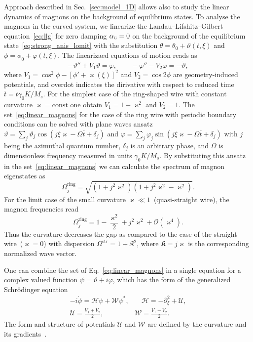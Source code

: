Approach described in Sec.~\ref{sec:model_1D} allows also to study the linear dynamics of magnons on the background of equilibrium states. To analyse the magnons in the curved system, we linearize the Landau--Lifshitz--Gilbert equation~\eqref{eq:llg} for zero damping $\alpha_\textsc{g}=0$ on the background of the equilibrium state~\eqref{eq:strong_anis_lomit} with the substitution $\theta=\theta_0+\vartheta(t,\xi)$ and $\phi=\phi_0+\varphi(t,\xi)$. The linearizaed equations of motion reads as~\cite{Sheka15,Gaididei18a,Korniienko19b}
\begin{equation}\label{eq:linear_magnons}
    -\vartheta''+V_1\vartheta = \dot{\varphi},\quad \quad -\varphi''-V_2\varphi = -\dot{\vartheta},
\end{equation}
where $V_1 = \cos^2\phi - \left[\phi'+\varkappa(\xi)\right]^2$ and $V_2 = \cos2\phi$ are geometry-induced potentials, and overdot indicates the dirivative with respect to reduced time $\overline{t}=t\gamma_0K/M_s$. For the simplest case of the ring-shaped wire with constant curvature $\varkappa=\text{const}$ one obtain $V_1=1-\varkappa^2$ and $V_2=1$. The set~\eqref{eq:linear_magnons} for the case of the ring wire with periodic boundary conditions can be solved with plane waves ansatz $\vartheta=\sum_j \vartheta_j \cos(j\xi\varkappa-\Omega\overline{t}+\delta_j)$ and $\varphi=\sum_j \varphi_j \sin(j\xi\varkappa-\Omega\overline{t}+\delta_j)$ with $j$ being the azimuthal quantum number, $\delta_j$ is an arbitrary phase, and $\Omega$ is dimensionless frequency measured in units $\gamma_0K/M_s$. By substituting this ansatz in the set~\eqref{eq:linear_magnons} we can calculate the spectrum of magnon eigenstates as
\begin{equation}\label{eq:spec_rings}
    \Omega^\text{ring}_j = \sqrt{\left(1+j^2\varkappa^2\right)\left(1+j^2\varkappa^2 - \varkappa^2\right)}.
\end{equation}
For the limit case of the small curvature $\varkappa\ll1$~(quasi-straight wire), the magnon frequencies read
\begin{equation}\label{eq:spec_rings_small}
    \Omega^\text{ring}_j = 1- \frac{\varkappa^2}{2}+j^2\varkappa^2+\mathcal{O}(\varkappa^4).
\end{equation}
Thus the curvature decreases the gap as compared to the case of the straight wire~($\varkappa=0$) with dispersion $\Omega^\text{str} = 1 + \mathfrak{K}^2$, where $\mathfrak{K}=j\varkappa$ is the corresponding normalized wave vector.

One can combine the set of Eq.~\eqref{eq:linear_magnons} in a single equation for a complex valued function $\psi=\vartheta+i\varphi$, which has the form of the generalized Schr\"odinger equation
\begin{equation}
    \begin{split}
       -i\dot{\psi} = \mathcal{H}\psi+\mathcal{W}\psi^*,& \quad \mathcal{H}=-\partial_\xi^2+\mathcal{U},\\
       \mathcal{U} = \frac{V_1+V_2}{2},\quad &\mathcal{W} = \frac{V_1-V_2}{2}.
    \end{split}
\end{equation}
The form and structure of potentials $\mathcal{U}$ and $\mathcal{W}$ are defined by the curvature and its gradients~\cite{Gaididei18a,Korniienko19b}. 

